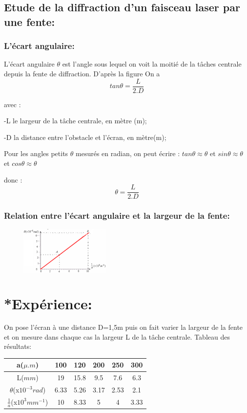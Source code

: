 \documentclass[12pt]{article}
\begin{document}
\subsection{Etude de la diffraction d'un faisceau laser par une fente:}
\subsubsection{L'écart angulaire:}

L'écart angulaire $\theta$ est l'angle sous lequel on voit la moitié de la tâches centrale depuis la fente de diffraction.
D'après la figure On a $$tan\theta = \frac{L}{2.D}$$ 

avec  : 

-L le largeur de la tâche centrale, en mètre (m);

-D la distance entre l’obstacle et l’écran, en mètre(m); 

Pour les angles petits $\theta$ mesurés en radian, on peut écrire :
	$tan\theta \approx \theta$   et $sin\theta \approx \theta$
	et $cos \theta \approx \theta$

	donc : $$\theta = \frac{L}{2.D} $$
	\subsubsection{Relation entre l'écart angulaire et la largeur de la fente: }

	\begin{figure}

	\vspace{2cm}
	\includegraphics[width=0.4\textwidth]{./img/OLcourbe.png}

\end{figure}


	\section*{*Expérience:}
On pose l'écran à une distance D=1,5m puis on fait varier la largeur de la fente et on mesure dans chaque cas la largeur L de la tâche
centrale.
Tableau des résultats:

\begin{tabular}{ |c|c|c|c|c|c| }
	  \hline
	  a($\mu.m$) & 100 & 120 & 200 & 250 & 300  \\ \hline
	  L($mm$)	 & 19   &  15.8  & 9.5 & 7.6  & 6.3   \\\hline
	  $\theta$(x$10^{-3}rad$)& 6.33   & 5.26   & 3.17 & 2.53  & 2.1   \\\hline
	  $\frac{1}{a}$(x$10^{3}mm^{-1}$)	 & 10   &  8.33  &5  & 4  &3.33    \\\hline

\hline
\end{tabular}
\end{document}
